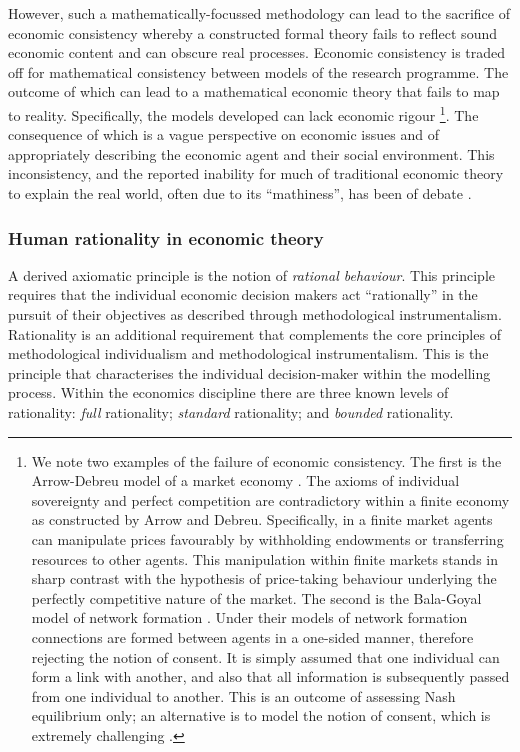 However, such a mathematically-focussed methodology can lead to the sacrifice of economic consistency whereby a constructed formal theory fails to reflect sound economic content and can obscure real processes. Economic consistency is traded off for mathematical consistency between models of the research programme. The outcome of which can lead to a mathematical economic theory that fails to map to reality. Specifically, the models developed can lack economic rigour \footnote{We note two examples of the failure of economic consistency. The first is the Arrow-Debreu model of a market economy \citep{ArrowDebreu1954}. The axioms of individual sovereignty and perfect competition are contradictory within a finite economy as constructed by Arrow and Debreu. Specifically, in a finite market agents can manipulate prices favourably by withholding endowments or transferring resources to other agents. This manipulation within finite markets stands in sharp contrast with the hypothesis of price-taking behaviour underlying the perfectly competitive nature of the market. The second is the Bala-Goyal model of network formation \citep{BalaGoyal2000a}. Under their models of network formation connections are formed between agents in a one-sided manner, therefore rejecting the notion of consent. It is simply assumed that one individual can form a link with another, and also that all information is subsequently passed from one individual to another. This is an outcome of assessing Nash equilibrium only; an alternative is to model the notion of consent, which is extremely challenging \citep{GillesSarangi-Building, GillesSarangi2010}.}. The consequence of which is a vague perspective on economic issues and of appropriately describing the economic agent and their social environment. This inconsistency, and the reported inability for much of traditional economic theory to explain the real world, often due to its ``mathiness'', has been of debate \citep{Romer2015}.

\subsubsection{Human rationality in economic theory}

A derived axiomatic principle is the notion of \emph{rational behaviour}. This principle requires that the individual economic decision makers act ``rationally'' in the pursuit of their objectives as described through methodological instrumentalism. Rationality is an additional requirement that complements the core principles of methodological individualism and methodological instrumentalism. This is the principle that characterises the individual decision-maker within the modelling process. Within the economics discipline there are three known levels of rationality: \emph{full} rationality; \emph{standard} rationality; and \emph{bounded} rationality.

